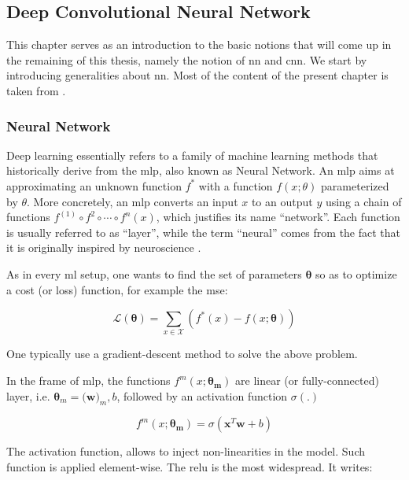 \subsection{Deep Convolutional Neural Network}
\label{sec:cnn}

This chapter serves as an introduction to the basic notions that will come up in the remaining of this thesis, namely the notion of \gls{nn} and \gls{cnn}.
We start by introducing generalities about \gls{nn}.
Most of the content of the present chapter is taken from \cite{goodfellow16}.

\subsubsection{Neural Network}
Deep learning essentially refers to a family of machine learning methods that historically derive from the \gls{mlp}, also known as Neural Network.
An \gls{mlp} aims at approximating an unknown function $f^{*}$ with a function $f(x;\theta)$ parameterized by $\theta$.
More concretely, an \gls{mlp} converts an input $x$ to an output $y$ using a chain of functions $f^{(1)} \circ f^{2} \circ \cdots \circ f^{n}(x)$, which justifies its name ``network''.
Each function is usually referred to as ``layer'', while the term ``neural'' comes from the fact that it is originally inspired by neuroscience \cite{mcculloch43}.

As in every \gls{ml} setup, one wants to find the set of parameters $\bm{\theta}$ so as to optimize a cost (or loss) function, for example the \gls{mse}:

\begin{equation}
\mathcal{L}(\bm{\theta}) = \sum_{x\in \mathcal{X}}(f^{*}(x)-f(x;\bm{\theta}))
\end{equation}

One typically use a gradient-descent method to solve the above problem.

In the frame of \gls{mlp}, the functions $f^{m}(x;\bm{\theta_{m}})$ are linear (or fully-connected) layer, i.e. $\bm{\theta}_m=(\bm{w)}_{m},b$, followed by an activation function $\sigma(.)$

\begin{equation}
f^{m}(x;\bm{\theta_{m}}) = \sigma(\bm{x}^{T}\bm{w} + b)
\end{equation}

The activation function, allows to inject non-linearities in the model.
Such function is applied element-wise.
The \gls{relu} is the most widespread.
It writes:

